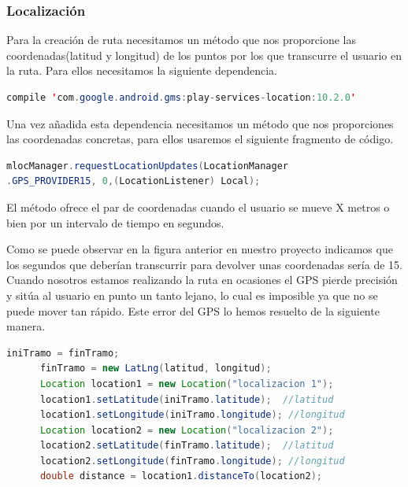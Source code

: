  
 
 \subsubsection{Localización}
  Para la creación de ruta necesitamos un método que nos proporcione las coordenadas(latitud y longitud) de los puntos por los que transcurre el usuario en la ruta. Para ellos necesitamos la siguiente dependencia.

	
\begin{lstlisting}[language=java,caption={Dependencia de Location},label=DescriptiveLabel]
compile 'com.google.android.gms:play-services-location:10.2.0'


\end{lstlisting}	
	
	
	Una vez añadida esta dependencia necesitamos un método que nos proporciones las coordenadas concretas, para ellos usaremos el siguiente fragmento de código.
	
\begin{lstlisting}[language=java,caption={Obtencion de coordenadas  por intervalo de tiempo},label=DescriptiveLabel]
mlocManager.requestLocationUpdates(LocationManager
.GPS_PROVIDER15, 0,(LocationListener) Local);


\end{lstlisting}	

El método ofrece el par de coordenadas cuando el usuario se mueve X metros o bien por un intervalo de tiempo en segundos.


Como se puede observar en la figura anterior en nuestro proyecto indicamos que los segundos que deberían transcurrir para devolver unas coordenadas sería de 15.\\
Cuando nosotros estamos realizando la ruta en ocasiones el GPS pierde precisión y sitúa al usuario en punto un tanto lejano, lo cual es imposible ya que no se puede mover tan rápido. Este error del GPS lo hemos resuelto de la siguiente manera.\\



\newpage
\begin{lstlisting}[language=java,caption={Fragmento para el calculo de distancias entre puntos},label=DescriptiveLabel]
      iniTramo = finTramo;
      finTramo = new LatLng(latitud, longitud);
      Location location1 = new Location("localizacion 1");
      location1.setLatitude(iniTramo.latitude);  //latitud
      location1.setLongitude(iniTramo.longitude); //longitud
      Location location2 = new Location("localizacion 2");
      location2.setLatitude(finTramo.latitude);  //latitud
      location2.setLongitude(finTramo.longitude); //longitud
      double distance = location1.distanceTo(location2);
\end{lstlisting}

